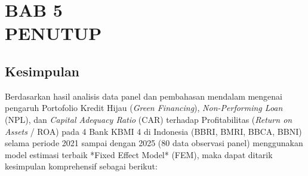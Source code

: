 \documentclass[12pt,a4paper]{article}
\numberwithin{equation}{section}
\begin{document}
\newpage
\setcounter{section}{0}
\section*{BAB 5\\[0.3cm]PENUTUP}
\setcounter{section}{5}
\setcounter{subsection}{0}

\subsection{Kesimpulan}

\noindent
Berdasarkan hasil analisis data panel dan pembahasan mendalam mengenai pengaruh Portofolio Kredit Hijau (\emph{Green Financing}), \emph{Non-Performing Loan} (NPL), dan \emph{Capital Adequacy Ratio} (CAR) terhadap Profitabilitas (\emph{Return on Assets} / ROA) pada 4 Bank KBMI 4 di Indonesia (BBRI, BMRI, BBCA, BBNI) selama periode 2021 sampai dengan 2025 (80 data observasi panel) menggunakan model estimasi terbaik *Fixed Effect Model* (FEM), maka dapat ditarik kesimpulan komprehensif sebagai berikut:
\end{document}
